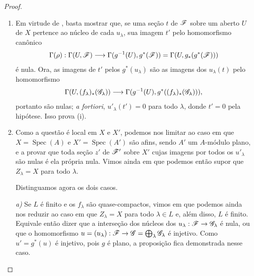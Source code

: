 \begin{proof}
\begin{enumerate}[label=(\roman*)]
  \item Em virtude de
  ,
  basta mostrar que,
  se uma seção $t$ de
  $\mathscr{F}$ sobre um
  aberto $U$ de $X$
  pertence ao núcleo
  de cada $u_\lambda$,
  sua imagem $t'$ pelo
  homomorfismo canônico
  \[
  \Gamma(\rho):
  \Gamma(U,\mathscr{F})
  \longrightarrow
  \Gamma(g^{-1}(U),
  g^*(\mathscr{F}))
  =\Gamma(U,
  g_*(g^*(\mathscr{F})))
  \]
  é nula. Ora, as
  imagens de $t'$ pelos
  $g^*(u_\lambda)$ são
  as imagens dos
  $u_\lambda(t)$ pelo
  homomorfismo
  \[
  \Gamma(U,
  (f_\lambda)_*
  (\mathscr{G}_\lambda))
  \longrightarrow
  \Gamma(g^{-1}(U),
  g^*((f_\lambda)_*
  (\mathscr{G}_\lambda))),
  \]
  portanto são nulas;
  \emph{a fortiori},
  $u'_\lambda(t')=0$
  para todo $\lambda$,
  donde $t'=0$ pela
  hipótese. Isso
  prova (i).

  \item Como a questão
  é local em $X$ e
  $X'$, podemos nos
  limitar ao caso em
  que
  $X=\operatorname{Spec}(A)$
  e
  $X'=\operatorname{Spec}(A')$
  são afins, sendo
  $A'$ um $A$-módulo
  plano, e a provar
  que toda seção $z'$
  de $\mathscr{F}'$ sobre
  $X'$ cujas imagens
  por todos os
  $u'_\lambda$ são
  nulas é ela própria
  nula. Vimos ainda em
  que podemos então
  supor que
  $Z_\lambda=X$ para
  todo $\lambda$.

  Distinguamos agora
  os dois casos.

  \emph{a)} Se $L$
  é finito e os
  $f_\lambda$ são
  quase-compactos,
  vimos em
  que podemos ainda
  nos reduzir ao
  caso em que
  $Z_\lambda=X$
  para todo
  $\lambda\in L$ e,
  além disso, $L$
  é finito. Equivale
  então dizer que a
  interseção dos
  núcleos dos
  $u_\lambda:
  \sh{F}\to
  \sh{G}_\lambda$
  é nula, ou que o
  homomorfismo
  $u=(u_\lambda):
  \sh{F}\to
  \sh{G}=
  \bigoplus_\lambda
  \sh{G}_\lambda$
  é injetivo. Como
  $u'=g^*(u)$ é
  injetivo, pois
  $g$ é plano, a
  proposição fica
  demonstrada nesse
  caso.


\end{enumerate}
\end{proof}
